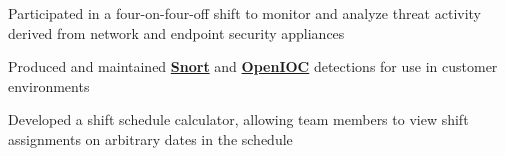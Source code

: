 \documentclass[letterpaper]{deedy-resume} %
\begin{document}
\begin{minipage}[t]{0.66\textwidth}
\sectionspace %



\begin{tightitemize}
\item Participated in a four-on-four-off shift to monitor and analyze threat activity derived from network and endpoint security appliances
\item Produced and maintained \textbf{\href{https://www.snort.org/}{Snort}} and \textbf{\href{https://github.com/fireeye/OpenIOC_1.1}{OpenIOC}} detections for use in customer environments
\item Developed a shift schedule calculator, allowing team members to view shift assignments on arbitrary dates in the schedule
\end{tightitemize}

\sectionspace %




\end{minipage} %








\end{document}
